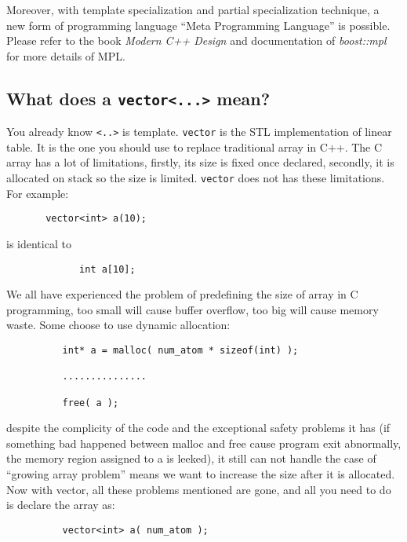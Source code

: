 \documentclass[letterpaper]{book}
\begin{document}
Moreover, with template specialization and partial specialization technique, 
a new form of programming language ``Meta Programming Language'' is possible. 
Please refer to the book {\it Modern C++ Design} and documentation of 
{\it boost::mpl} for more details of MPL.


\subsection*{What does a \lstinline$vector<...>$ mean?}
You already know \lstinline$<..>$ is template. \lstinline$vector$ is the 
STL implementation of linear table. It is the one you should use to replace 
traditional array in C++. The C array has a lot of limitations, firstly,
its size is fixed once declared, secondly, it is allocated on stack so the 
size is limited.
\lstinline$vector$ does not has these limitations.  For example:

\begin{lstlisting}
       vector<int> a(10);
\end{lstlisting}

is identical to 

\begin{lstlisting}      
             int a[10];
\end{lstlisting}

We all have experienced the problem of predefining the size of array in C 
programming, too small will cause buffer overflow, too big will cause memory
waste. Some choose to use dynamic allocation:

\begin{lstlisting}
          int* a = malloc( num_atom * sizeof(int) );

          ...............

          free( a );
\end{lstlisting}

despite the complicity of the code and the exceptional safety problems it has
 (if something bad happened between malloc and free cause program exit 
abnormally, the memory region assigned to a is leeked), it still can not handle
the case of ``growing array problem'' means we want to increase the size after
it is allocated. Now with vector, all these problems mentioned are gone, and
all you need to do is declare the array as:

\begin{lstlisting}
          vector<int> a( num_atom );
\end{lstlisting}
\end{document}
